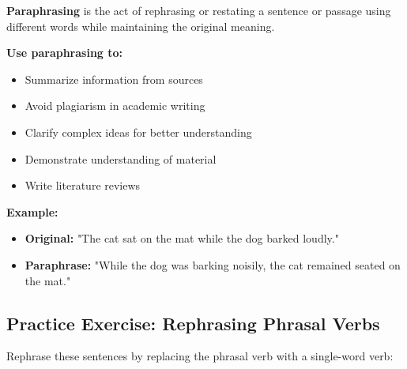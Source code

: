 \begin{grammarbox}[title=When to Use Paraphrasing]
\textbf{Paraphrasing} is the act of rephrasing or restating a sentence or passage using different words while maintaining the original meaning.

\textbf{Use paraphrasing to:}
\begin{itemize}
    \item Summarize information from sources
    \item Avoid plagiarism in academic writing
    \item Clarify complex ideas for better understanding
    \item Demonstrate understanding of material
    \item Write literature reviews
\end{itemize}

\textbf{Example:}
\begin{itemize}
    \item \textbf{Original:} "The cat sat on the mat while the dog barked loudly."
    \item \textbf{Paraphrase:} "While the dog was barking noisily, the cat remained seated on the mat."
\end{itemize}
\end{grammarbox}

\subsection{Practice Exercise: Rephrasing Phrasal Verbs}

Rephrase these sentences by replacing the phrasal verb with a single-word verb:

